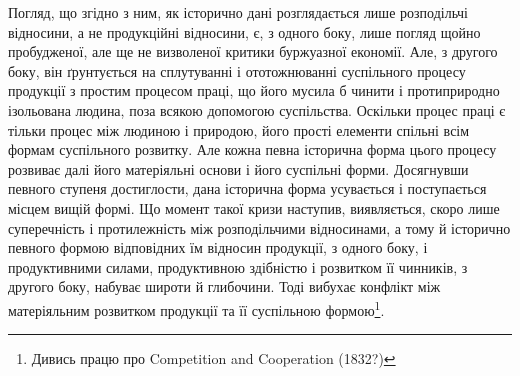 Погляд, що згідно з ним, як історично дані розглядається лише розподільчі
відносини, а не продукційні відносини, є, з одного боку, лише погляд щойно пробудженої,
але ще не визволеної критики буржуазної економії. Але, з другого боку,
він ґрунтується на сплутуванні і ототожнюванні суспільного процесу продукції з
простим процесом праці, що його мусила б чинити і протиприродно ізольована
людина, поза всякою допомогою суспільства. Оскільки процес праці є тільки процес
між людиною і природою, його прості елементи спільні всім формам суспільного
розвитку. Але кожна певна історична форма цього процесу розвиває далі його матеріяльні
основи і його суспільні форми. Досягнувши певного ступеня достиглости,
дана історична форма усувається і поступається місцем вищій формі. Що момент
такої кризи наступив, виявляється, скоро лише суперечність і протилежність між
розподільчими відносинами, а тому й історично певного формою відповідних їм відносин
продукції, з одного боку, і продуктивними силами, продуктивною здібністю
і розвитком її чинників, з другого боку, набуває широти й глибочини. Тоді вибухає
конфлікт між матеріяльним розвитком продукції та її суспільною формою\footnote{
Дивись працю про Competition and Cooperation (1832?)
}.
